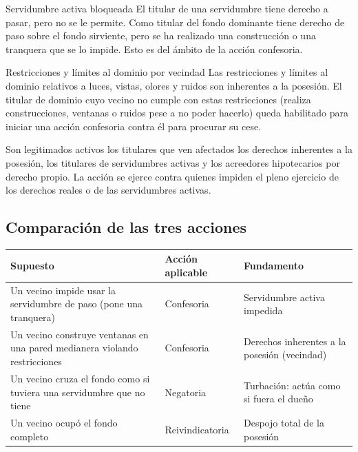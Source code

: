 \documentclass[12pt,oneside]{book}
\begin{document}
\begin{example}{Servidumbre activa bloqueada}
El titular de una servidumbre tiene derecho a pasar, pero no se le permite. Como titular del fondo dominante tiene derecho de paso sobre el fondo sirviente, pero se ha realizado una construcción o una tranquera que se lo impide. Esto es del ámbito de la acción confesoria.
\end{example}

\begin{example}{Restricciones y límites al dominio por vecindad}
Las restricciones y límites al dominio relativos a luces, vistas, olores y ruidos son inherentes a la posesión. El titular de dominio cuyo vecino no cumple con estas restricciones (realiza construcciones, ventanas o ruidos pese a no poder hacerlo) queda habilitado para iniciar una acción confesoria contra él para procurar su cese.
\end{example}

Son legitimados activos los titulares que ven afectados los derechos inherentes a la posesión, los titulares de servidumbres activas y los acreedores hipotecarios por derecho propio. La acción se ejerce contra quienes impiden el pleno ejercicio de los derechos reales o de las servidumbres activas.

\subsection{Comparación de las tres acciones}

\begin{table}[H]
\centering
\small
\begin{tabularx}{\textwidth}{@{}>{\raggedright\arraybackslash}X>{\raggedright\arraybackslash}p{}>{\raggedright\arraybackslash}X@{}}
\toprule
\textbf{Supuesto} & \textbf{Acción aplicable} & \textbf{Fundamento} \\
\midrule
Un vecino impide usar la servidumbre de paso (pone una tranquera) & Confesoria & Servidumbre activa impedida \\
Un vecino construye ventanas en una pared medianera violando restricciones & Confesoria & Derechos inherentes a la posesión (vecindad) \\
Un vecino cruza el fondo como si tuviera una servidumbre que no tiene & Negatoria & Turbación: actúa como si fuera el dueño \\
Un vecino ocupó el fondo completo & Reivindicatoria & Despojo total de la posesión \\
\bottomrule
\end{tabularx}
\end{table}
\end{document}
